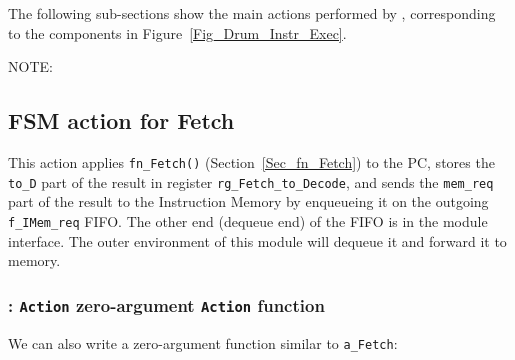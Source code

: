 The following sub-sections show the main actions performed by {\DRUM},
corresponding to the components in Figure~\ref{Fig_Drum_Instr_Exec}.

\vspace{2ex}


NOTE: 


\subsection{FSM action for Fetch}


This action applies \verb|fn_Fetch()| (Section~\ref{Sec_fn_Fetch}) to
the PC, stores the \verb|to_D| part of the result in register
\verb|rg_Fetch_to_Decode|, and sends the \verb|mem_req| part of the
result to the Instruction Memory by enqueueing it on the outgoing
\verb|f_IMem_req| FIFO.  The other end (dequeue end) of the FIFO is in
the module interface.  The outer environment of this module will
dequeue it and forward it to memory.


\subsubsection{{\BSV}: {\tt Action} {\vs} zero-argument {\tt Action} function}

We can also write a zero-argument function similar to \verb|a_Fetch|:

